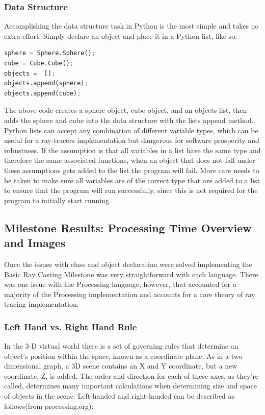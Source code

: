 \subsubsection{Data Structure}
Accomplishing the data structure task in Python is the most simple and takes no extra effort.  Simply declare an object and place it in a Python list, like so:
\begin{lstlisting}[language=Python, caption=Python List Example, style=mystyle]
sphere = Sphere.Sphere();
cube = Cube.Cube();
objects =  [];
objects.append(sphere);
objects.append(cube);
\end{lstlisting}
The above code creates a sphere object, cube object, and an objects list, then adds the sphere and cube into the data structure with the lists append method.  Python lists can accept any combination of different variable types, which can be useful for a ray-tracers implementation but dangerous for software prosperity and robustness.  If the assumption is that all variables in a list have the same type and therefore the same associated functions, when an object that does not fall under these assumptions gets added to the list the program will fail.  More care needs to be taken to make sure all variables are of the correct type that are added to a list to ensure that the program will run successfully, since this is not required for the program to initially start running.

\subsection{Milestone Results: Processing Time Overview and Images}
Once the issues with class and object declaration were solved implementing the Basic Ray Casting Milestone was very straightforward with each language.  There was one issue with the Processing language, however, that accounted for a majority of the Processing implementation and accounts for a core theory of ray tracing implementation.
\subsubsection{Left Hand vs. Right Hand Rule}
In the 3-D virtual world there is a set of governing rules that determine an object's position within the space, known as a coordinate plane.  As in a two dimensional graph, a 3D scene contains an X and Y coordinate, but a new coordinate, Z, is added.  The order and direction for each of these axes, as they're called, determines many important calculations when determining size and space of objects in the scene.  Left-handed and right-handed can be described as follows(from processing.org):

